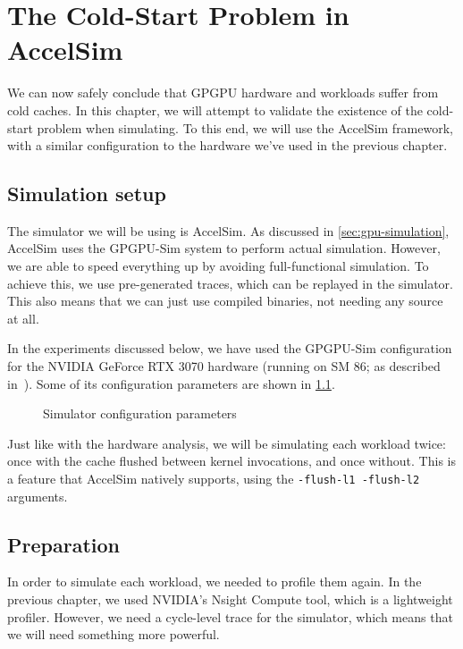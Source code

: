 \chapter{The Cold-Start Problem in AccelSim}\label{~\cite}

We can now safely conclude that GPGPU hardware and workloads suffer from cold caches.
In this chapter, we will attempt to validate the existence of the cold-start problem when simulating.
To this end, we will use the AccelSim framework, with a similar configuration to the hardware we've used in the previous chapter.

\section{Simulation setup}\label{sec:simulation-setup}
The simulator we will be using is AccelSim\cite{accelsim}.
As discussed in \cref{sec:gpu-simulation}, AccelSim uses the GPGPU-Sim\cite{gpgpu-sim} system to perform actual simulation.
However, we are able to speed everything up by avoiding full-functional simulation.
To achieve this, we use pre-generated traces, which can be replayed in the simulator.
This also means that we can just use compiled binaries, not needing any source at all.

In the experiments discussed below, we have used the GPGPU-Sim configuration for the NVIDIA GeForce RTX 3070 hardware (running on SM 86; as described in\ \cite{nvidia-wp}).
Some of its configuration parameters are shown in \cref{fig:sim_config}.

\begin{figure}[ht]
    \centering
    
    \caption{Simulator configuration parameters}
    \label{fig:sim_config}
\end{figure}

Just like with the hardware analysis, we will be simulating each workload twice: once with the cache flushed between kernel invocations, and once without.
This is a feature that AccelSim natively supports, using the \verb|-flush-l1 -flush-l2| arguments.

\FloatBarrier
\section{Preparation}\label{sec:preparation}
In order to simulate each workload, we needed to profile them again.
In the previous chapter, we used NVIDIA's Nsight Compute tool, which is a lightweight profiler.
However, we need a cycle-level trace for the simulator, which means that we will need something more powerful.

